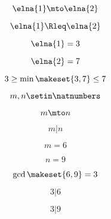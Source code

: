 \begin{forslides}
    \begin{equation}
        \label{eq:systems-010}
        \elna{1} \mto \elna{2}
    \end{equation}

    \begin{equation}
        \label{eq:systems-011}
        \elna{1}\Rleq \elna{2}
    \end{equation}

    \begin{equation}
        \label{eq:systems-012}
        \elna{1} = 3
    \end{equation}

    \begin{equation}
        \label{eq:systems-013}
        \elna{2} = 7
    \end{equation}

    \begin{equation}
        \label{eq:systems-014}
        3 \geq \min \makeset{3, 7} \leq 7
    \end{equation}

    \begin{equation}
        \label{eq:systems-015}
        m, n \setin \natnumbers
    \end{equation}

    \begin{equation}
        \label{eq:systems-016}
        m \mto n
    \end{equation}

    \begin{equation}
        \label{eq:systems-017}
        m | n
    \end{equation}

    \begin{equation}
        \label{eq:systems-018}
        m = 6
    \end{equation}

    \begin{equation}
        \label{eq:systems-019}
        n = 9
    \end{equation}

    \begin{equation}
        \label{eq:systems-020}
        \gcd \makeset{6, 9 } = 3
    \end{equation}

    \begin{equation}
        \label{eq:systems-021}
        3 | 6
    \end{equation}

    \begin{equation}
        \label{eq:systems-022}
        3 | 9
    \end{equation}


\end{forslides}
